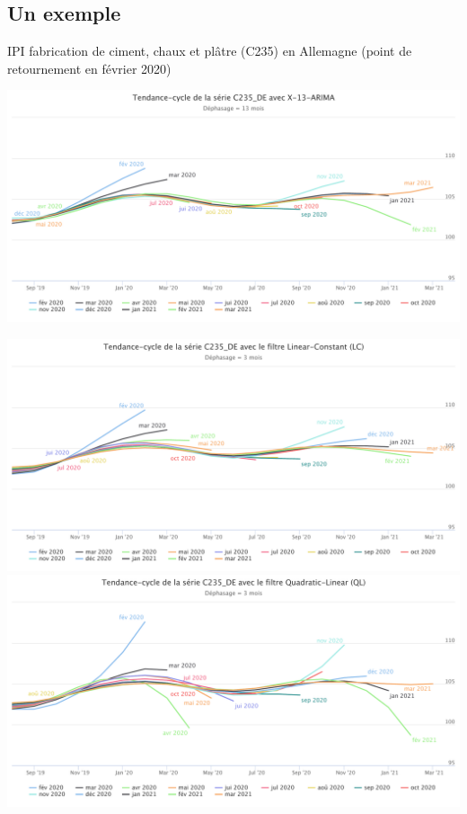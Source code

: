 \documentclass[10pt,xcolor=table,color={dvipsnames,usenames},ignorenonframetext,usepdftitle=false,french]{beamer}
\newcommand\1{\mathds{1}}
\begin{document}
\hypertarget{un-exemple}{%
\subsection{Un exemple}\label{un-exemple}}

\begin{frame}{IPI fabrication de ciment, chaux et plâtre (C235) en
Allemagne (point de retournement en février 2020)}
\protect\hypertarget{ipi-fabrication-de-ciment-chaux-et-pluxe2tre-c235-en-allemagne-point-de-retournement-en-fuxe9vrier-2020}{}
\begin{center}\includegraphics[height=0.5\paperheight]{img/simulations/c235_de_x13} \end{center}
\end{frame}

\begin{frame}{}
\protect\hypertarget{section}{}
\begin{center}\includegraphics[height=0.5\paperheight]{img/simulations/c235_de_lc} \includegraphics[height=0.5\paperheight]{img/simulations/c235_de_ql} \end{center}
\end{frame}
\end{document}
